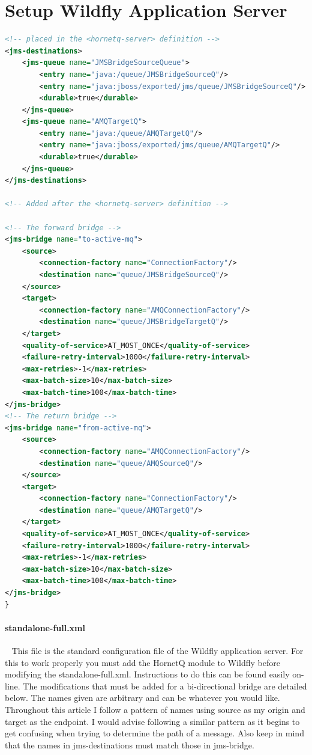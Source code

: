 \documentclass[
10pt, %
letterpaper, %
oneside, %
headinclude,footinclude, %
BCOR5mm, %
]{scrartcl}
\begin{document}

\section{Setup Wildfly Application Server}


\begin{lstlisting}[language=XML]
<!-- placed in the <hornetq-server> definition -->
<jms-destinations>
	<jms-queue name="JMSBridgeSourceQueue">
		<entry name="java:/queue/JMSBridgeSourceQ"/>
		<entry name="java:jboss/exported/jms/queue/JMSBridgeSourceQ"/>
		<durable>true</durable>
	</jms-queue>
	<jms-queue name="AMQTargetQ">
		<entry name="java:/queue/AMQTargetQ"/>
		<entry name="java:jboss/exported/jms/queue/AMQTargetQ"/>
		<durable>true</durable>
	</jms-queue>
</jms-destinations>

<!-- Added after the <hornetq-server> definition -->

<!-- The forward bridge -->
<jms-bridge name="to-active-mq">
	<source>
		<connection-factory name="ConnectionFactory"/>
		<destination name="queue/JMSBridgeSourceQ"/>
	</source>
	<target>
		<connection-factory name="AMQConnectionFactory"/>
		<destination name="queue/JMSBridgeTargetQ"/>
	</target>
	<quality-of-service>AT_MOST_ONCE</quality-of-service>
	<failure-retry-interval>1000</failure-retry-interval>
	<max-retries>-1</max-retries>
	<max-batch-size>10</max-batch-size>
	<max-batch-time>100</max-batch-time>
</jms-bridge>
<!-- The return bridge -->
<jms-bridge name="from-active-mq">
	<source>
		<connection-factory name="AMQConnectionFactory"/>
		<destination name="queue/AMQSourceQ"/>
	</source>
	<target>
		<connection-factory name="ConnectionFactory"/>
		<destination name="queue/AMQTargetQ"/>
	</target>
	<quality-of-service>AT_MOST_ONCE</quality-of-service>
	<failure-retry-interval>1000</failure-retry-interval>
	<max-retries>-1</max-retries>
	<max-batch-size>10</max-batch-size>
	<max-batch-time>100</max-batch-time>
</jms-bridge>
}
\end{lstlisting}

\paragraph{standalone-full.xml} ~\newline\newline
This file is the standard configuration file of the Wildfly application server. For this to work properly you must add the HornetQ module to Wildfly before modifying the standalone-full.xml. Instructions to do this can be found easily on-line. The modifications that must be added for a bi-directional bridge are detailed below. The names given are arbitrary and can be whatever you would like. Throughout this article I follow a pattern of names using source as my origin and target as the endpoint. I would advise following a similar pattern as it begins to get confusing when trying to determine the path of a message. Also keep in mind that the names in jms-destinations must match those in jms-bridge.\newline
\end{document}
